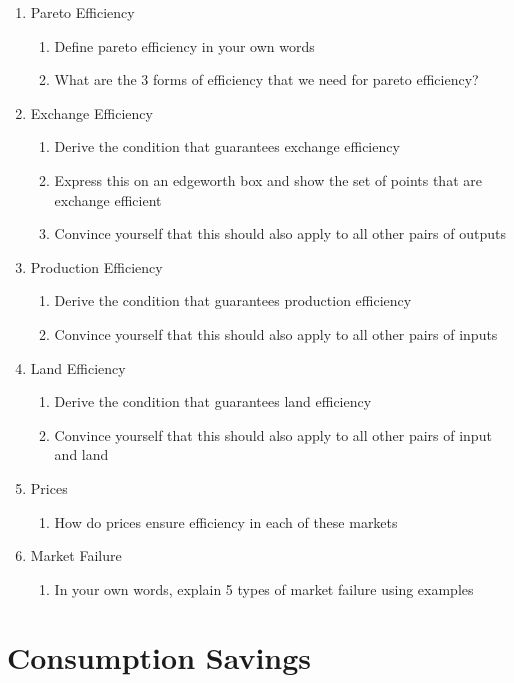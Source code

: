 \documentclass[11pt]{scrartcl}
\begin{document}
\begin{enumerate}
\item Pareto Efficiency
\begin{enumerate}
\item Define pareto efficiency in your own words
\item What are the 3 forms of efficiency that we need for pareto efficiency?
\end{enumerate}
\item Exchange Efficiency
\begin{enumerate}
\item Derive the condition that guarantees exchange efficiency
\item Express this on an edgeworth box and show the set of points that are exchange efficient
\item Convince yourself that this should also apply to all other pairs of outputs
\end{enumerate}
\item Production Efficiency
\begin{enumerate}
\item Derive the condition that guarantees production efficiency
\item Convince yourself that this should also apply to all other pairs of inputs
\end{enumerate}
\item Land Efficiency
\begin{enumerate}
\item Derive the condition that guarantees land efficiency
\item Convince yourself that this should also apply to all other pairs of input and land
\end{enumerate}
\item Prices
\begin{enumerate}
\item How do prices ensure efficiency in each of these markets
\end{enumerate}
\item Market Failure
\begin{enumerate}
\item In your own words, explain 5 types of market failure using examples
\end{enumerate}
\end{enumerate}

\section{Consumption Savings}
\end{document}
